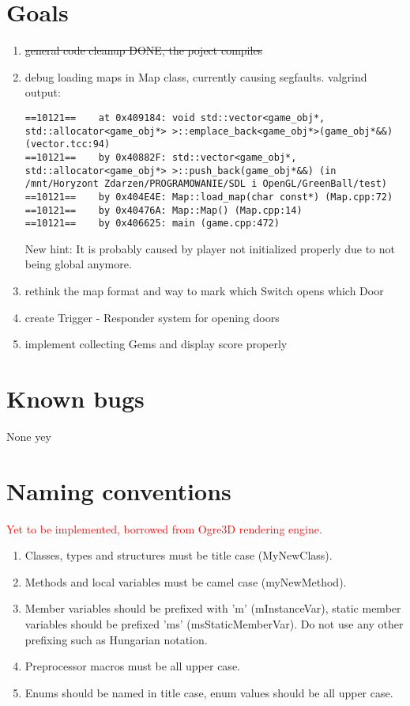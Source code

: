 \documentclass[11pt,a4paper,oneside]{report}
\begin{document}
\section{Goals}
\begin{enumerate}
	\item \st{general code cleanup DONE, the poject compiles}
	\item debug loading maps in Map class, currently causing segfaults. valgrind output:
		\begin{lstlisting}
==10121==    at 0x409184: void std::vector<game_obj*, std::allocator<game_obj*> >::emplace_back<game_obj*>(game_obj*&&) (vector.tcc:94)
==10121==    by 0x40882F: std::vector<game_obj*, std::allocator<game_obj*> >::push_back(game_obj*&&) (in /mnt/Horyzont Zdarzen/PROGRAMOWANIE/SDL i OpenGL/GreenBall/test)
==10121==    by 0x404E4E: Map::load_map(char const*) (Map.cpp:72)
==10121==    by 0x40476A: Map::Map() (Map.cpp:14)
==10121==    by 0x406625: main (game.cpp:472)
		\end{lstlisting}
		New hint: It is probably caused by player not initialized properly due to not being global anymore.
	\item rethink the map format and way to mark which Switch opens which Door
	\item create Trigger - Responder system for opening doors
	\item implement collecting Gems and display score properly
\end{enumerate}
\section{Known bugs}
None yey
\section{Naming conventions}
\textcolor{red}{Yet to be implemented, borrowed from Ogre3D rendering engine.}
\begin{enumerate}
	\item Classes, types and structures must be title case (MyNewClass).
	\item Methods and local variables must be camel case (myNewMethod). 
	\item Member variables should be prefixed with 'm' (mInstanceVar), static member variables should be prefixed 'ms' (msStaticMemberVar). Do not use any other prefixing such as Hungarian notation.
	\item Preprocessor macros must be all upper case.
	\item Enums should be named in title case, enum values should be all upper case.
\end{enumerate}
\end{document}
